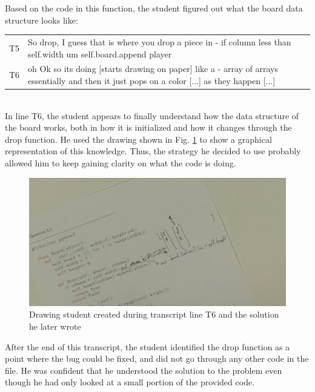 Based on the code in this function, the student figured out what the board data structure looks like: \\
\begin{tabular}{lp{13cm}}
T5& So drop, I guess that is where you drop a piece in - if column less than self.width um self.board.append player \\
T6&oh Ok so its doing  [starts drawing on paper] like a - array of arrays essentially and then it just pops on a color [...] as they happen [...] \\
\end{tabular}\\
In line T6, the student appears to finally understand how the data structure of the board works, both in how it is initialized and how it changes through the drop function. He used the drawing shown in Fig. \ref{fig-q4-drawing} to show a graphical representation of this knowledge. 
Thus, the strategy he decided to use probably allowed him to keep gaining clarity on what the code is doing. \\

\begin{figure}[t]
\centering
\includegraphics[width=1.0\textwidth]{2_2drawing.png}
\caption{Drawing student created during transcript line T6 and the solution he later wrote}
\label{fig-q4-drawing}
\end{figure}

After the end of this transcript, the student identified the drop function as a point where the bug could be fixed, and did not go through any other code in the file. 
He was confident that he understood the solution to the problem even though he had only looked at a small portion of the provided code. 



